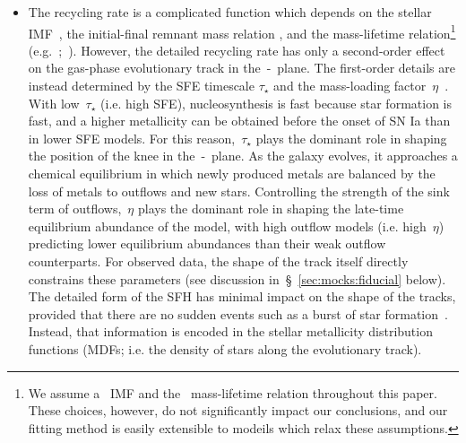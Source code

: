 \documentclass[ms.tex]{subfiles}
\begin{document}
\begin{itemize}
	\item The recycling rate is a complicated function which depends on the
	stellar IMF~\citep[e.g.][]{Salpeter1955, Miller1979, Kroupa2001,
	Chabrier2003}, the initial-final remnant mass relation
	\citep[e.g.][]{Kalirai2008}, and the mass-lifetime relation\footnote{
		We assume a~\citet{Kroupa2001} IMF and the~\citet{Larson1974}
		mass-lifetime relation throughout this paper.
		These choices, however, do not significantly impact our conclusions,
		and our fitting method is easily extensible to modeils which relax
		these assumptions.
	} (e.g.~\citealp{Larson1974, Maeder1989};~\citealp*{Hurley2000}).
	However, the detailed recycling rate has only a second-order effect on
	the gas-phase evolutionary track in the~\afe-\feh~plane.
	The first-order details are instead determined by the SFE timescale
	$\tau_\star$ and the mass-loading factor~$\eta$~\citep{Weinberg2017}.
	With low~$\tau_\star$ (i.e. high SFE), nucleosynthesis is fast because
	star formation is fast, and a higher metallicity can be obtained before
	the onset of SN Ia than in lower SFE models.
	For this reason,~$\tau_\star$ plays the dominant role in shaping the
	position of the knee in the~\afe-\feh~plane.
	As the galaxy evolves, it approaches a chemical equilibrium in which
	newly produced metals are balanced by the loss of metals to outflows
	and new stars.
	Controlling the strength of the sink term of outflows,~$\eta$ plays
	the dominant role in shaping the late-time equilibrium abundance of the
	model, with high outflow models (i.e. high~$\eta$) predicting lower
	equilibrium abundances than their weak outflow counterparts.
	For observed data, the shape of the track itself directly constrains
	these parameters (see discussion in~\S~\ref{sec:mocks:fiducial} below).
	The detailed form of the SFH has minimal impact on the shape of the
	tracks, provided that there are no sudden events such as a burst of
	star formation~\citep{Weinberg2017, Johnson2020}.
	Instead, that information is encoded in the stellar metallicity
	distribution functions (MDFs; i.e. the density of stars along the
	evolutionary track).





\end{itemize}
\end{document}
